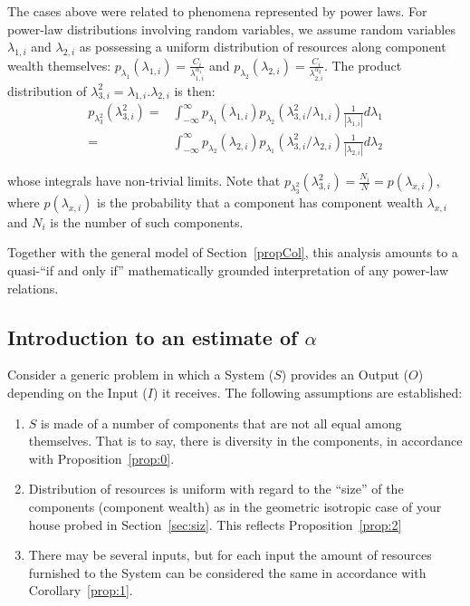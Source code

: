 \documentclass[10pt,letterpaper]{article}
\begin{document}
The cases above were related to phenomena represented by power laws.
For power-law distributions involving random variables, we assume
random variables
$\lambda_{1,i}$ and $\lambda_{2,i}$ as possessing a uniform distribution of resources along component wealth
themselves:
$p_{\lambda_{1}}(\lambda_{1,i})=\frac{C_i}{\lambda_{1,i}^{\alpha_1}}$
and
$p_{\lambda_{2}}(\lambda_{2,i})=\frac{C_i}{\lambda_{2,i}^{\alpha_2}}$.
The product distribution of
$\lambda_{3,i}^2=\lambda_{1,i}.\lambda_{2,i}$
is then:
\begin{align}
	p_{\lambda_3^2}(\lambda_{3,i}^2) = & \int_{-\infty}^{\infty} p_{\lambda_1}(\lambda_{1,i}) p_{\lambda_2}(\lambda_{3,i}^2/\lambda_{1,i})\frac{1}{|\lambda_{1,i}|}d\lambda_1 \\
	= & \int_{-\infty}^{\infty} p_{\lambda_2}(\lambda_{2,i}) p_{\lambda_1}(\lambda_{3,i}^2/\lambda_{2,i})\frac{1}{|\lambda_{2,i}|}d\lambda_2
\end{align}

\noindent whose integrals have non-trivial limits.
Note that $p_{\lambda_3^2}(\lambda_{3,i}^2)=\frac{N_i}{N}=p(\lambda_{x,i})$,
where $p(\lambda_{x,i})$ is the probability that a component has component wealth $\lambda_{x,i}$ and $N_i$ is the number of such components. 


Together with the general model of Section~\ref{propCol}, this analysis amounts to a quasi-``if and only if'' mathematically grounded interpretation of any power-law relations.

\subsection{Introduction to an estimate of $\alpha$}
Consider a generic problem in which a System ($S$) provides an Output ($O$) depending on the Input ($I$) it receives.
The following assumptions are established:
\begin{enumerate}
	\item $S$ is made of a number of components that are not all equal among themselves.
That is to say, there is diversity in the components, in accordance with Proposition~\ref{prop:0}. 
\item Distribution of resources is uniform with regard to the ``size'' of the components (component wealth) as in the geometric isotropic case of your house probed in Section~\ref{sec:siz}.
This reflects Proposition~\ref{prop:2}
\item There may be several inputs, but for each input the amount of resources furnished to the System can be considered the same 
	in accordance with Corollary~\ref{prop:1}.
\end{enumerate}
\end{document}
